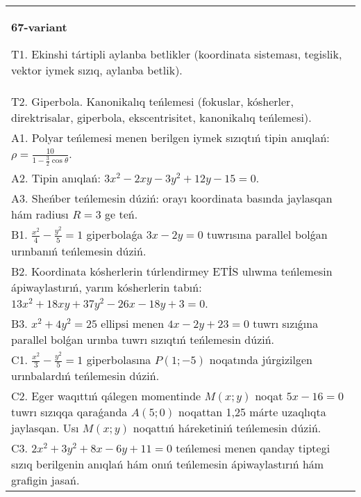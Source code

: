 \documentclass{article}
\begin{document}
\begin{tabular}{m{17cm}}
\textbf{67-variant}
\newline

T1. Ekinshi tártipli aylanba betlikler (koordinata sisteması, tegislik, vektor iymek sızıq, aylanba betlik).\\

T2. Giperbola. Kanonikalıq teńlemesi (fokuslar, kósherler, direktrisalar, giperbola, ekscentrisitet, kanonikalıq teńlemesi).\\

A1. Polyar teńlemesi menen berilgen iymek sızıqtıń tipin anıqlań: $\rho=\frac{10}{1-\frac{3}{2}\cos\theta}$.\\

A2. Tipin anıqlań: $3 x^{2}-2 xy-3 y^{2}+12 y-15=0$.\\

A3. Sheńber teńlemesin dúziń: orayı koordinata basında jaylasqan hám radiusı $R=3$ ge teń.\\

B1. $\frac{x^{2}}{4} - \frac{y^{2}}{5} = 1$ giperbolaǵa $3x - 2y = 0$ tuwrısına parallel bolǵan urınbanıń teńlemesin dúziń.  \\

B2. Koordinata kósherlerin túrlendirmey ETİS ulıwma teńlemesin ápiwaylastırıń, yarım kósherlerin tabıń: $13x^{2} + 18xy + 37y^{2} - 26x - 18y + 3 = 0$.  \\

B3. $x^{2} + 4y^{2} = 25$ ellipsi menen $4x - 2y + 23 = 0$ tuwrı sızıǵına parallel bolǵan urınba tuwrı sızıqtıń teńlemesin dúziń.  \\

C1. $\frac{x^{2}}{3} - \frac{y^{2}}{5} = 1$ giperbolasına $P(1; - 5)$ noqatında júrgizilgen urınbalardıń teńlemesin dúziń.\\

C2. Eger waqıttıń qálegen momentinde $M(x;y)$ noqat $5x - 16 = 0$ tuwrı sızıqqa qaraǵanda $A(5;0)$ noqattan 1,25 márte uzaqlıqta jaylasqan. Usı $M(x;y)$ noqattıń háreketiniń teńlemesin dúziń.  \\

C3. $2x^{2} + 3y^{2} + 8x - 6y + 11 = 0$ teńlemesi menen qanday tiptegi sızıq berilgenin anıqlań hám onıń teńlemesin ápiwaylastırıń hám grafigin jasań.  \\

\end{tabular}
\vspace{1cm}
\end{document}
